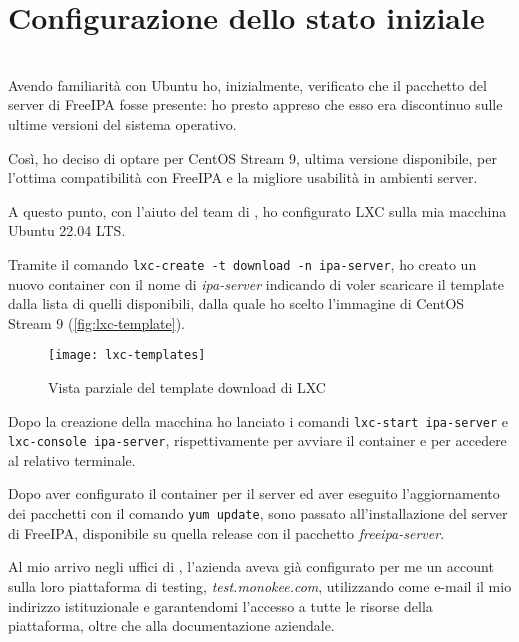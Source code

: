 
\chapter{Configurazione dello stato iniziale}
\label{cap:configurazione-stato-iniziale}

\\

Avendo familiarità con Ubuntu ho, inizialmente, verificato che il pacchetto del server di FreeIPA fosse presente: ho presto appreso che esso era discontinuo sulle ultime versioni del sistema operativo.

Così, ho deciso di optare per CentOS Stream 9, ultima versione disponibile, per l'ottima compatibilità con FreeIPA e la migliore usabilità in ambienti server.

A questo punto, con l'aiuto del team di \myAzienda, ho configurato LXC sulla mia macchina Ubuntu 22.04 LTS. 

Tramite il comando \texttt{lxc-create -t download -n ipa-server}, ho creato un nuovo container con il nome di \emph{ipa-server} indicando di voler scaricare il template dalla lista di quelli disponibili, dalla quale ho scelto l'immagine di CentOS Stream 9 (\autoref{fig:lxc-template}).

\begin{figure}[!h] 
    \centering 
    \texttt{[image: lxc-templates]} 
    \caption{Vista parziale del template download di LXC}
    \label{fig:lxc-template}
\end{figure}

Dopo la creazione della macchina ho lanciato i comandi \texttt{lxc-start ipa-server} e \texttt{lxc-console ipa-server}, rispettivamente per avviare il container e per accedere al relativo terminale.


Dopo aver configurato il container per il server ed aver eseguito l'aggiornamento dei pacchetti con il comando \texttt{yum update}, sono passato all'installazione del server di FreeIPA, disponibile su quella release con il pacchetto \emph{freeipa-server}.


Al mio arrivo negli uffici di \myAzienda, l'azienda aveva già configurato per me un account sulla loro piattaforma di testing, \emph{test.monokee.com}, utilizzando come e-mail il mio indirizzo istituzionale e garantendomi l'accesso a tutte le risorse della piattaforma, oltre che alla documentazione aziendale.